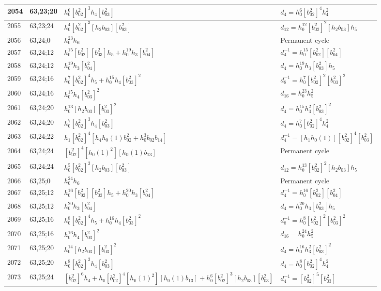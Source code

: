 \documentclass{article}
\begin{document}
\begin{longtable}{|l|l|>{\raggedright\arraybackslash}p{6cm}|>{\raggedright\arraybackslash}p{6cm}|}
2054 & 63,23;20 & $h_0^6[b_{02}^2]^3h_4[b_{03}^2]$ &$d_{4}=h_0^6[b_{02}^2]^4h_4^2$\\
\hline
2055 & 63,23;24 & $h_0^4[b_{02}^2]^3[h_2b_{03}][b_{03}^2]$ &$d_{12}=h_0^{12}[b_{02}^2]^2[h_2b_{03}]h_5$\\
\hline
2056 & 63,24;0 & $h_0^{23}h_6$ & Permanent cycle\\
\hline
2057 & 63,24;12 & $h_0^{15}[b_{02}^2][b_{03}^2]h_5 + h_0^{19}h_3[b_{04}^2]$ & $d_{4}^{-1}=h_0^{15}[b_{02}^2][b_{04}^2]$\\
2058 & 63,24;12 & $h_0^{19}h_3[b_{04}^2]$ &$d_{4}=h_0^{19}h_3[b_{03}^2]h_5$\\
\hline
2059 & 63,24;16 & $h_0^7[b_{02}^2]^4h_5 + h_0^{15}h_4[b_{03}^2]^2$ & $d_{8}^{-1}=h_0^7[b_{02}^2]^2[b_{03}^2]^2$\\
2060 & 63,24;16 & $h_0^{15}h_4[b_{03}^2]^2$ &$d_{16}=h_0^{23}h_5^2$\\
\hline
2061 & 63,24;20 & $h_0^{13}[h_2b_{03}][b_{03}^2]^2$ &$d_{4}=h_0^{15}h_3^2[b_{03}^2]^2$\\
2062 & 63,24;20 & $h_0^7[b_{02}^2]^3h_4[b_{03}^2]$ &$d_{4}=h_0^7[b_{02}^2]^4h_4^2$\\
\hline
2063 & 63,24;22 & $h_1[b_{02}^2]^4[h_4h_0(1)b_{02}^2 + h_0^3b_{02}b_{14}]$ & $d_{4}^{-1}=[h_1h_0(1)][b_{02}^2]^4[b_{03}^2]$\\
\hline
2064 & 63,24;24 & $[b_{02}^2]^4[h_0(1)^2][h_0(1)b_{13}]$ & Permanent cycle\\
2065 & 63,24;24 & $h_0^5[b_{02}^2]^3[h_2b_{03}][b_{03}^2]$ &$d_{12}=h_0^{13}[b_{02}^2]^2[h_2b_{03}]h_5$\\
\hline
2066 & 63,25;0 & $h_0^{24}h_6$ & Permanent cycle\\
\hline
2067 & 63,25;12 & $h_0^{16}[b_{02}^2][b_{03}^2]h_5 + h_0^{20}h_3[b_{04}^2]$ & $d_{4}^{-1}=h_0^{16}[b_{02}^2][b_{04}^2]$\\
2068 & 63,25;12 & $h_0^{20}h_3[b_{04}^2]$ &$d_{4}=h_0^{20}h_3[b_{03}^2]h_5$\\
\hline
2069 & 63,25;16 & $h_0^8[b_{02}^2]^4h_5 + h_0^{16}h_4[b_{03}^2]^2$ & $d_{8}^{-1}=h_0^8[b_{02}^2]^2[b_{03}^2]^2$\\
2070 & 63,25;16 & $h_0^{16}h_4[b_{03}^2]^2$ &$d_{16}=h_0^{24}h_5^2$\\
\hline
2071 & 63,25;20 & $h_0^{14}[h_2b_{03}][b_{03}^2]^2$ &$d_{4}=h_0^{16}h_3^2[b_{03}^2]^2$\\
2072 & 63,25;20 & $h_0^8[b_{02}^2]^3h_4[b_{03}^2]$ &$d_{4}=h_0^8[b_{02}^2]^4h_4^2$\\
\hline
2073 & 63,25;24 & $[b_{02}^2]^6h_4 + h_0[b_{02}^2]^4[h_0(1)^2][h_0(1)b_{13}] + h_0^6[b_{02}^2]^3[h_2b_{03}][b_{03}^2]$ & $d_{4}^{-1}=[b_{02}^2]^5[b_{03}^2]$\\

\end{longtable}
\end{document}
